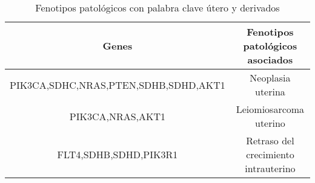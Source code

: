\begin{table}[h]
	\centering
	\caption{Fenotipos patológicos con palabra clave útero y derivados}
	\begin{tabular}{|c|c|}
		\hline
		\textbf{Genes} & \textbf{Fenotipos patológicos asociados} \\
		\hline
		PIK3CA,SDHC,NRAS,PTEN,SDHB,SDHD,AKT1 & Neoplasia uterina \\
		\hline
		PIK3CA,NRAS,AKT1 & Leiomiosarcoma uterino \\
		\hline
		FLT4,SDHB,SDHD,PIK3R1 & Retraso del crecimiento intrauterino \\
		\hline
	\end{tabular}
\end{table}
\clearpage
